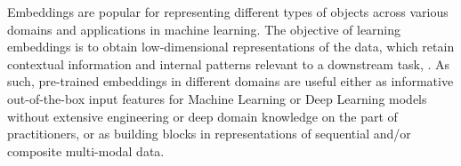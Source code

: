 \documentclass[sigconf, anonymous]{acmart}
\begin{document}


Embeddings are popular for representing different types of objects across various domains
and applications in machine learning.
%
The objective of learning embeddings is to obtain low-dimensional representations of the data,
which retain contextual information and internal patterns relevant to a downstream task,%
\citep{Mikolov2013EfficientEO,Peters2018DeepCW,Devlin2019BERTPO,Doersch2015UnsupervisedVR,Oord2018RepresentationLW}.
%
As such, pre-trained embeddings in different domains are useful either as informative
out-of-the-box input features for Machine Learning or Deep Learning models without extensive
engineering or deep domain knowledge on the part of practitioners, or as building blocks in
representations of sequential and/or composite multi-modal data.
%
\end{document}
